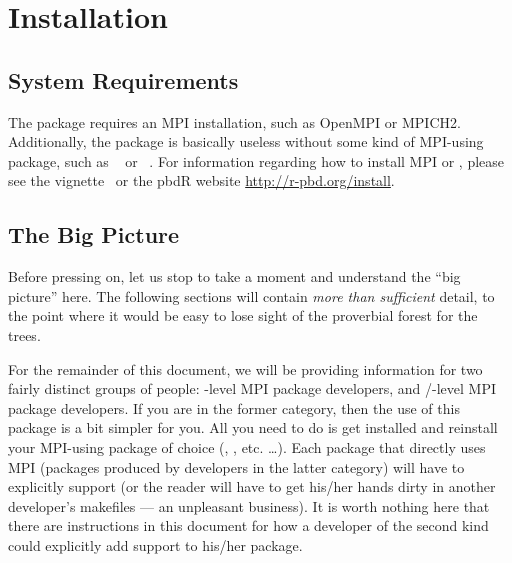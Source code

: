 \section{Installation}
\label{sec:installation}


\subsection[System Requirements]{System Requirements}
\label{sec:system_requirements}

The  package requires an MPI installation, such as OpenMPI or 
MPICH2.  Additionally, the package is basically useless without some kind of 
MPI-using  package, such 
as ~\citep{Chen2012pbdMPIpackage} or ~\citep{Yu2002}.
For information regarding how to install MPI or , please see the 
 vignette~\citep{Chen2012pbdMPIvignette} or the pbdR website 
\url{http://r-pbd.org/install}.


\subsection{The Big Picture}

Before pressing on, let us stop to take a moment and understand the ``big 
picture'' here. The following sections will contain \emph{more than sufficient} 
detail, to the point where it would be easy to lose sight of the proverbial 
forest for the trees.

For the remainder of this document, we will be providing information for two 
fairly distinct groups of people:  -level MPI package developers, 
and /-level MPI package developers.  If you are 
in the former category, then the use of this package is a bit simpler for you.  
All you need to do is get  installed and reinstall your MPI-using 
package of choice (, , etc. \dots).  Each package that 
directly uses MPI (packages produced by developers in the latter category) will 
have to explicitly support  (or the reader will have to get 
his/her hands dirty in another developer's makefiles --- an unpleasant 
business).  It is worth nothing here that there are instructions in this 
document for how a developer of the second kind could explicitly add 
 support to his/her package.
  
